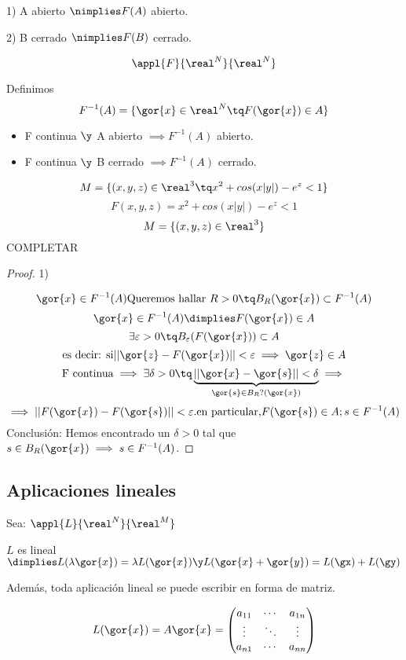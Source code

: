 \documentclass[a4paper,10pt]{apuntes}
\begin{document}
1) A abierto $\nimplies F(A)$ abierto.

2) B cerrado $\nimplies F(B)$ cerrado.

\[\appl{F}{\real^N}{\real^N}\]


Definimos
$$F^{-1} (A) = \{\gor{x}\in \real^N \tq F(\gor{x})\in A\}$$
\begin{theorem}
\begin{itemize}
\item F continua $\y$ A abierto $\implies F^{-1} (A)$ abierto.
\item F continua $\y$ B cerrado $\implies F^{-1} (A)$ cerrado.
\end{itemize}
\end{theorem}

\app
$$M=\{(x,y,z) \in \real^3 \tq x^2 + cos(x|y|) - e^z < 1 \}$$
$$F(x,y,z) = x^2 + cos(x|y|) - e^z < 1 $$
\[M=\{(x,y,z) \in \real^3\}\]
COMPLETAR

\begin{proof}
1)

\[\gor{x} \in F^{-1} (A) \text {Queremos hallar } R>0 \tq B_R(\gor{x})\subset F^{-1} (A)\]
\[\gor{x}\in F^{-1} (A) \dimplies F(\gor{x})\in A\]
\[\exists \varepsilon>0 \tq B_{\varepsilon}(F(\gor{x}))\subset A\]
\[\text{es decir: si} ||\gor{z}-F(\gor{x})|| < \varepsilon \implies \gor{z}\in A\]
\[\text{F continua} \implies \exists \delta > 0 \tq \underbrace{||\gor{x}-\gor{s}||<\delta}_{\gor{s}\in B_R?(\gor{x})} \implies\]
\[\implies ||F(\gor{x})-F(\gor{s})||<\varepsilon. \text{en particular,} F(\gor{s}) \in A; s \in F^{-1} (A)\]
Conclusión: Hemos encontrado un $\delta > 0$ tal que $s \in B_R(\gor{x}) \implies s \in F^{-1} (A)$.
\end{proof}
\subsection{Aplicaciones lineales}
Sea: $\appl{L}{\real^N}{\real^M}$

$L$ es lineal $\dimplies L(\lambda \gor{x}) = \lambda L(\gor{x}) \y L(\gor{x}+\gor{y}) = L(\gx)+L(\gy)$

Además, toda aplicación lineal se puede escribir en forma de matriz.

\[L(\gor{x})=A\gor{x} =
\begin{pmatrix}
a_{11} 	& \cdots & a_{1n}		\\
\vdots	& \ddots &  \vdots 	\\
a_{n1}	& \cdots & a_{nn} 
\end{pmatrix}\]
\end{document}

